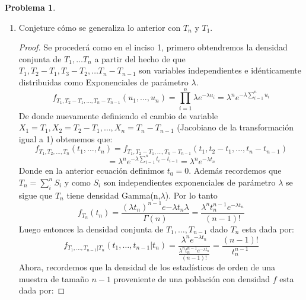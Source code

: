 \documentclass[a5paper,oneside]{amsart}
\theoremstyle{plain}
\theoremstyle{definition}
\newtheorem{problema}{Problema}
\begin{document}
\begin{problema}
\begin{enumerate}
\begin{proof}
Luego por independencia de $U$ con $W_1$ y $W_2$ sabemos que la conjunta es el producto de la marginales y por tanto usando el teorema fundamental del calculo:
$$
f_{U,S}(u,s)=(\lambda)^2s e^{-\lambda s}\mathds{1}_{0\leq u \leq 1}\mathds{1}_{0 \leq s}ds
$$
Definamos a la variable $Y=U(W_1+W_2)=US$ entonces el problema se reduce a encontrar la densidad  la  de Y.
$$
f_Y(y)=F'_Y(y)=\frac{\partial}{\partial y}\p(Y\leq y)=\frac{\partial}{\partial y}\p(US  \leq y)=\frac{\partial}{\partial y}\p(S  \leq \frac{y}{U})
$$
$$
=\int_0^{\infty}f_{U,S} (\frac{y}{s},s)\frac{1}{s}ds=\int_0^{\infty}\lambda^2e^{-\lambda s}\mathds{1}_{0 \leq {y} \leq s}\mathds{1}_{0 \leq s}ds=\int_y^{\infty}\lambda^2 e^{-\lambda s}ds
$$
Por lo tanto:
$$
f_Y(y)=\int_y^{\infty}\lambda^2 e^{-\lambda s}ds=\lambda(1-(1-e^{-\lambda y}))=\lambda e^{-\lambda y}
$$
Por lo tanto $Y$ tiene distribuci\'on exponencial de par\'ametro $\lambda$.  
\end{proof}
\item Conjeture c\'omo se  generaliza lo anterior con $T_n$ y $T_1$.
\begin{proof}
Se proceder\'a como en el inciso 1, primero obtendremos la densidad conjunta  de $T_1,\ldots T_n$ a partir del hecho de que $T_1, T_2-T_1, T_3-T_2,\ldots T_n-T_{n-1}$ son variables independientes e id\'enticamente distribuidas como Exponenciales de par\'ametro $\lambda$.
$$
f_{T_1, T_2-T_1,\ldots ,T_n-T_{n-1}}(u_1,\ldots, u_n)=\prod_{i=1}^{n}\lambda e^{-\lambda u_i}=\lambda^n e^{-\lambda \sum_{i=1}^{n}u_i}
$$
De donde nuevamente definiendo el cambio de variable\\ $X_1=T_1, X_2=T_2-T_1,\ldots , X_n=T_n-T_{n-1}$  (Jacobiano de la transformaci\'on igual a 1) obtenemos que:
$$
f_{T_1, T_2, \ldots ,T_n}(t_1,\ldots, t_n)=f_{T_1, T_2-T_1,\ldots ,T_n-T_{n-1}}(t_1,t_2-t_1,\ldots,t_n-t_{n-1})
$$
$$
=\lambda^n e^{-\lambda \sum_{i=1}^{n}t_i-t_{i-1}}=\lambda^n e^{-\lambda t_n}
$$
Donde en la anterior ecuaci\'on definimos $t_0=0$.  Adem\'as recordemos que $T_n=\sum_{i}^{n}S_i$ y como  $S_i$ son independientes  exponenciales de par\'ametro $\lambda$   se sigue que $T_n$ tiene densidad Gamma(n,$\lambda$). Por lo tanto
$$
f_{T_n}(t_n)=\frac{(\lambda t_n)^{n-1}e{-\lambda t_n} \lambda}{\Gamma(n)}=\frac{\lambda^n t_n^{n-1}e^{-\lambda t_n}}{(n-1)!}
$$
Luego entonces la densidad conjunta de $T_1,\ldots, T_{n-1}$ dado $T_n$ esta dada por:
$$
f_{T_1,\ldots ,T_{n-1}|T_n}(t_1,\ldots, t_{n-1}|t_n)=\frac{\lambda^n e^{-\lambda t_n}}{ \frac{\lambda^n t_n^{n-1}e^{-\lambda t_n}}{(n-1)!}}=\frac{(n-1)!}{t_n^{n-1}}
$$
Ahora, recordemos que la densidad de los estad\'isticos de orden de una muestra de tama\~no $n-1$  proveniente de una poblaci\'on con  densidad $f$ esta dada por:

\end{proof}
\end{enumerate}
\end{problema}
\end{document}
